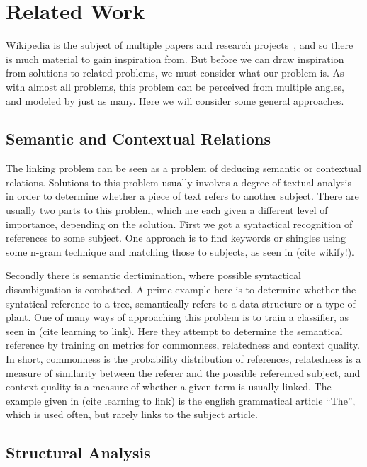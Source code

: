 \section{Related Work}\label{sec:related_work}

Wikipedia is the subject of multiple papers and research projects~\cite{wiki-research-newsletter}, and so there is much material to gain inspiration from. But before we can draw inspiration from solutions to related problems, we must consider what our problem is. As with almost all problems, this problem can be perceived from multiple angles, and modeled by just as many. Here we will consider some general approaches.

\subsection{Semantic and Contextual Relations}\label{related_semantic_contextual}

The linking problem can be seen as a problem of deducing semantic or contextual relations. Solutions to this problem usually involves a degree of textual analysis in order to determine whether a piece of text refers to another subject. There are usually two parts to this problem, which are each given a different level of importance, depending on the solution. First we got a syntactical recognition of references to some subject. One approach is to find keywords or shingles using some n-gram technique and matching those to subjects, as seen in (cite wikify!). 

Secondly there is semantic dertimination, where possible syntactical disambiguation is combatted. A prime example here is to determine whether the syntatical reference to a tree, semantically refers to a data structure or a type of plant. One of many ways of approaching this problem is to train a classifier, as seen in (cite learning to link). Here they attempt to determine the semantical reference by training on metrics for commonness, relatedness and context quality. In short, commonness is the probability distribution of references, relatedness is a measure of similarity between the referer and the possible referenced subject, and context quality is a measure of whether a given term is usually linked. The example given in (cite learning to link) is the english grammatical article \enquote{The}, which is used often, but rarely links to the subject article.

\subsection{Structural Analysis}\label{related_structural_analysis}

